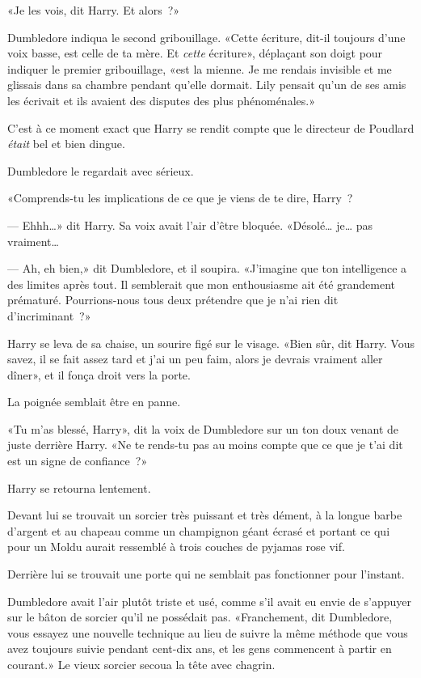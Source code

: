 «Je les vois, dit Harry. Et alors~?»

Dumbledore indiqua le second gribouillage. «Cette écriture, dit-il toujours d'une voix basse, est celle de ta mère. Et \emph{cette} écriture», déplaçant son doigt pour indiquer le premier gribouillage, «est la mienne. Je me rendais invisible et me glissais dans sa chambre pendant qu'elle dormait. Lily pensait qu'un de ses amis les écrivait et ils avaient des disputes des plus phénoménales.»

C'est à ce moment exact que Harry se rendit compte que le directeur de Poudlard \emph{était} bel et bien dingue.

Dumbledore le regardait avec sérieux.

«Comprends-tu les implications de ce que je viens de te dire, Harry~?

--- Ehhh…» dit Harry. Sa voix avait l'air d'être bloquée. «Désolé… je… pas vraiment…

--- Ah, eh bien,» dit Dumbledore, et il soupira. «J'imagine que ton intelligence a des limites après tout. Il semblerait que mon enthousiasme ait été grandement prématuré. Pourrions-nous tous deux prétendre que je n'ai rien dit d'incriminant~?»

Harry se leva de sa chaise, un sourire figé sur le visage. «Bien sûr, dit Harry. Vous savez, il se fait assez tard et j'ai un peu faim, alors je devrais vraiment aller dîner», et il fonça droit vers la porte.

La poignée semblait être en panne.

«Tu m'as blessé, Harry», dit la voix de Dumbledore sur un ton doux venant de juste derrière Harry. «Ne te rends-tu pas au moins compte que ce que je t'ai dit est un signe de confiance~?»

Harry se retourna lentement.

Devant lui se trouvait un sorcier très puissant et très dément, à la longue barbe d'argent et au chapeau comme un champignon géant écrasé et portant ce qui pour un Moldu aurait ressemblé à trois couches de pyjamas rose vif.

Derrière lui se trouvait une porte qui ne semblait pas fonctionner pour l'instant.

Dumbledore avait l'air plutôt triste et usé, comme s'il avait eu envie de s'appuyer sur le bâton de sorcier qu'il ne possédait pas. «Franchement, dit Dumbledore, vous essayez une nouvelle technique au lieu de suivre la même méthode que vous avez toujours suivie pendant cent-dix ans, et les gens commencent à partir en courant.» Le vieux sorcier secoua la tête avec chagrin.

